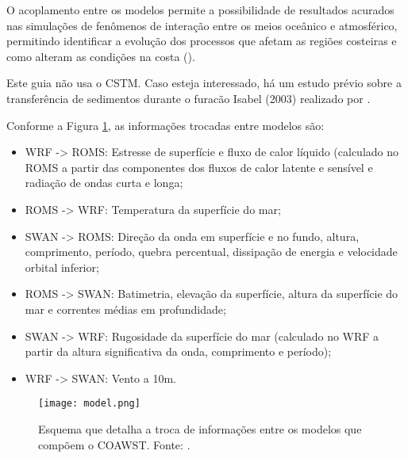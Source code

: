 \noindent O acoplamento entre os modelos permite a possibilidade de resultados acurados nas simulações de fenômenos de interação entre os meios oceânico e atmosférico, permitindo identificar a evolução dos processos que afetam as regiões costeiras e como alteram as condições na costa (\cite{Pullen2018, Miller2018}).
\bigskip

\begin{tcolorbox}[enhanced,
  grow to left by   = 0cm,
  grow to right by  = 0cm,
  enlarge top by    = 0cm,
  enlarge bottom by = 0cm,
  tcbox raise base,
  boxrule           = 1.0pt,
  left              = 18mm,
  colframe          = red!50!black,coltext=red!25!black,colback=red!10!white,
  overlay           = {\begin{tcbclipinterior}\fill[red!75!blue!50!white] (frame.south west)
    rectangle node[text=white,font=\sffamily\bfseries\footnotesize,rotate=0] {ATENÇÃO} ([xshift=18mm]frame.north west);\end{tcbclipinterior}}]
Este guia não usa o CSTM. Caso esteja interessado, há um estudo prévio sobre a transferência de sedimentos durante o furacão Isabel (2003) realizado por \textcite{Warner2010}.
\end{tcolorbox}
\bigskip


\noindent Conforme a Figura \textcolor{bleu_cite}{\ref{acopla}}, as informações trocadas entre modelos são:
\bigskip

\begin{itemize}
\item WRF -> ROMS: Estresse de superfície e fluxo de calor líquido (calculado no ROMS a partir das componentes dos fluxos de calor latente e sensível e radiação de ondas curta e longa;
\item ROMS -> WRF: Temperatura da superfície do mar;
\item SWAN -> ROMS: Direção da onda em superfície e no fundo, altura, comprimento, período, quebra percentual, dissipação de energia e velocidade orbital inferior;
\item ROMS -> SWAN: Batimetria, elevação da superfície, altura da superfície do mar e correntes médias em profundidade;
\item SWAN -> WRF: Rugosidade da superfície do mar (calculado no WRF a partir da altura significativa da onda, comprimento e período);
\item WRF -> SWAN: Vento a 10m.
\end{itemize}
\bigskip

\begin{figure}[H]
    \centering
    \captionsetup{justification=centering}
    \texttt{[image: model.png]}
    \caption{Esquema que detalha a troca de informações entre os modelos que compõem o COAWST. \newline Fonte: \textcite{Warner2018}.}
    \label{acopla}
\end{figure}
\bigskip

